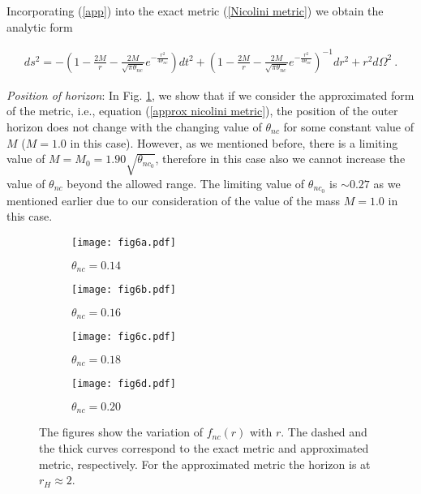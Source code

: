 \documentclass[aps,prd,showpacs,nofootinbib,floats,floatfix,preprintnumbers,groupedaddress,twocolumn]{revtex4-1}
\begin{document}
Incorporating (\ref{app}) into the exact metric (\ref{Nicolini metric}) we obtain the analytic form  \cite{Nicolini:2008aj}
%
%
%
%
\begin{widetext}
	\begin{eqnarray}
	ds^{2}=-\left(1-\frac{2M}{r}-\frac{2M}{\sqrt{\pi\theta_{nc}}}e^{-\frac{r^{2}}{4\theta_{nc}}}\right)dt^{2}+\left(1-\frac{2M}{r}-\frac{2M}{\sqrt{\pi\theta_{nc}}}e^{-\frac{r^{2}}{4\theta_{nc}}}\right)^{-1}dr^{2}+r^{2}d\Omega^{2}\label{approx nicolini metric}~.
	\end{eqnarray}
\end{widetext}
%
%
%
%
{\it{Position of horizon}}: In Fig. \ref{fig:6}, we show that if we consider the approximated form of the metric, i.e., equation (\ref{approx nicolini metric}), the position of the outer horizon does not change with the changing value of $\theta_{nc}$ for some constant value of $M$ ($M=1.0$ in this case). However, as we mentioned before, there is a limiting value of $M=M_0=1.90\sqrt{\theta_{nc_0}}$, therefore in this case also we cannot increase the value of $\theta_{nc}$ beyond the allowed range. The limiting value of $\theta_{nc_0}$ is $\sim 0.27$ as we mentioned earlier due to our consideration of the value of the mass $M=1.0$ in this case.  
%
%
%
\begin{figure}[htb!]
	\centering
	\begin{subfigure}[b]{0.49\linewidth}
		\texttt{[image: fig6a.pdf]}
		\caption{$\theta_{nc} = 0.14$}
	\end{subfigure}
	\begin{subfigure}[b]{0.49\linewidth}
		\texttt{[image: fig6b.pdf]}
		\caption{$\theta_{nc} = 0.16$}
	\end{subfigure}
	\begin{subfigure}[b]{0.49\linewidth}
		\texttt{[image: fig6c.pdf]}
		\caption{$\theta_{nc} = 0.18$}
	\end{subfigure}
	\begin{subfigure}[b]{0.49\linewidth}
	\texttt{[image: fig6d.pdf]}
	\caption{$\theta_{nc} = 0.20$}
\end{subfigure}
\caption{The figures show the variation of $f_{nc}(r)$ with $r$. The dashed and the thick curves correspond to the exact metric and approximated metric, respectively. For the approximated metric the horizon is at $r_H\approx2$.}
\label{fig:6}
\end{figure}
%
%
%	
\end{document}
